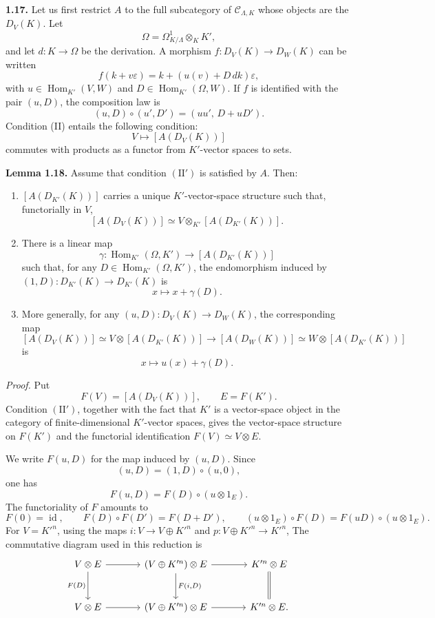 \documentclass[11pt]{article}
\providecommand{\Hom}{\operatorname{Hom}}
\begin{document}
\textbf{1.17.} Let us first restrict \(A\) to the full subcategory of
\(\mathcal C_{\Lambda,K}\) whose objects are the \(D_V(K)\). Let
\[
 \Omega=\Omega^1_{K/\Lambda}\otimes_K K',
\]
and let \(d:K\to \Omega\) be the derivation. A morphism
\(f:D_V(K)\to D_W(K)\) can be written
\[
 f(k+v\varepsilon)=k+(u(v)+D\,dk)\varepsilon,
\]
with \(u\in\Hom_{K'}(V,W)\) and \(D\in\Hom_{K'}(\Omega,W)\). If \(f\) is identified
with the pair \((u,D)\), the composition law is
\[
 (u,D)\circ(u',D')=(uu',\,D+uD').
\]
Condition (II) entails the following condition:
\[
\tag{II'}
 V\longmapsto [A(D_V(K))]
\]
commutes with products as a functor from \(K'\)-vector spaces to sets.

\textbf{Lemma 1.18.} Assume that condition \((\mathrm{II}')\) is satisfied by \(A\). Then:

\begin{enumerate}[label=(\arabic*)]
\item \([A(D_{K'}(K))]\) carries a unique \(K'\)-vector-space structure such that, functorially in
\(V\),
\[
 [A(D_V(K))]\simeq V\otimes_{K'}[A(D_{K'}(K))].
\]
\item There is a linear map
\[
 \gamma:\Hom_{K'}(\Omega,K')\longrightarrow [A(D_{K'}(K))]
\]
such that, for any \(D\in\Hom_{K'}(\Omega,K')\), the endomorphism induced by
\((1,D):D_{K'}(K)\to D_{K'}(K)\) is
\[
 x\longmapsto x+\gamma(D).
\]
\item More generally, for any \((u,D):D_V(K)\to D_W(K)\), the corresponding map
\[
 [A(D_V(K))]\simeq V\otimes[A(D_{K'}(K))]
 \longrightarrow
 [A(D_W(K))]\simeq W\otimes[A(D_{K'}(K))]
\]
is
\[
 x\longmapsto u(x)+\gamma(D).
\]
\end{enumerate}

\emph{Proof.} Put
\[
 F(V)=[A(D_V(K))],\qquad E=F(K').
\]
Condition \((\mathrm{II}')\), together with the fact that \(K'\) is a vector-space
object in the category of finite-dimensional \(K'\)-vector spaces, gives the vector-space
structure on \(F(K')\) and the functorial identification \(F(V)\simeq V\otimes E\).

We write \(F(u,D)\) for the map induced by \((u,D)\). Since
\[
 (u,D)=(1,D)\circ(u,0),
\]
one has
\[
 F(u,D)=F(D)\circ(u\otimes 1_E).
\]
The functoriality of \(F\) amounts to
\[
 F(0)=\operatorname{id},\qquad
 F(D)\circ F(D')=F(D+D'),\qquad
 (u\otimes 1_E)\circ F(D)=F(uD)\circ(u\otimes 1_E).
\]
For \(V=K'^n\), using the maps \(i:V\to V\oplus K'^n\) and
\(p:V\oplus K'^n\to K'^n\),
The commutative diagram used in this reduction is
\[
\begin{tikzcd}[column sep=large,row sep=large]
V\otimes E \arrow[r] \arrow[d,"F(D)"'] &
(V\oplus K'^n)\otimes E \arrow[r] \arrow[d,"{F(i,D)}"] &
K'^n\otimes E \arrow[d,equal]\\
V\otimes E \arrow[r] &
(V\oplus K'^n)\otimes E \arrow[r] &
K'^n\otimes E .
\end{tikzcd}
\]
\end{document}
